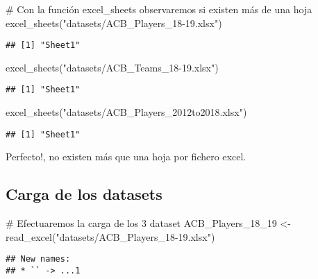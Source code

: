 \documentclass[]{article}
\newenvironment{Shaded}{\begin{snugshade}}{\end{snugshade}}
\newcommand{\KeywordTok}[1]{\textcolor[rgb]{0.94,0.87,0.69}{#1}}
\newcommand{\DecValTok}[1]{\textcolor[rgb]{0.86,0.86,0.80}{#1}}
\newcommand{\StringTok}[1]{\textcolor[rgb]{0.80,0.58,0.58}{#1}}
\newcommand{\CommentTok}[1]{\textcolor[rgb]{0.50,0.62,0.50}{#1}}
\newcommand{\NormalTok}[1]{\textcolor[rgb]{0.80,0.80,0.80}{#1}}
\begin{document}
\begin{Shaded}
\begin{Highlighting}[]
\CommentTok{# Con la función excel_sheets observaremos si existen más de una hoja}
\KeywordTok{excel_sheets}\NormalTok{(}\StringTok{"datasets/ACB_Players_18-19.xlsx"}\NormalTok{)}
\end{Highlighting}
\end{Shaded}

\begin{verbatim}
## [1] "Sheet1"
\end{verbatim}

\begin{Shaded}
\begin{Highlighting}[]
\KeywordTok{excel_sheets}\NormalTok{(}\StringTok{"datasets/ACB_Teams_18-19.xlsx"}\NormalTok{)}
\end{Highlighting}
\end{Shaded}

\begin{verbatim}
## [1] "Sheet1"
\end{verbatim}

\begin{Shaded}
\begin{Highlighting}[]
\KeywordTok{excel_sheets}\NormalTok{(}\StringTok{"datasets/ACB_Players_2012to2018.xlsx"}\NormalTok{)}
\end{Highlighting}
\end{Shaded}

\begin{verbatim}
## [1] "Sheet1"
\end{verbatim}

Perfecto!, no existen más que una hoja por fichero excel.

\subsection{Carga de los datasets}\label{carga-de-los-datasets}

\begin{Shaded}
\begin{Highlighting}[]
\CommentTok{# Efectuaremos la carga de los 3 dataset}
\NormalTok{ACB_Players_18_}\DecValTok{19}\NormalTok{ <-}\StringTok{ }\KeywordTok{read_excel}\NormalTok{(}\StringTok{"datasets/ACB_Players_18-19.xlsx"}\NormalTok{)}
\end{Highlighting}
\end{Shaded}

\begin{verbatim}
## New names:
## * `` -> ...1
\end{verbatim}
\end{document}

